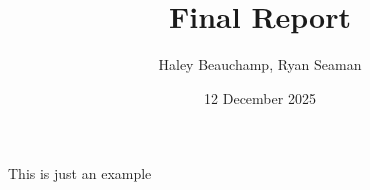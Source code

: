 \documentclass{homework}
\author{Haley Beauchamp, Ryan Seaman}
\date{12 December 2025}
\title{Final Report}
\begin{document}
 \maketitle

This is just an example \cite{arlinghaus1996part}

\newpage


\end{document}
